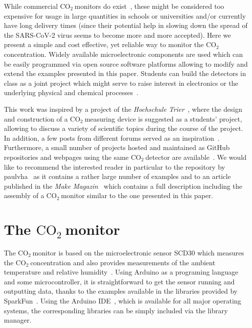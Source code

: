 \documentclass[12pt,a4paper]{article}
\newcommand{\coo}{\ensuremath{\mathrm{CO_2}~}}
\begin{document}
While commercial \coo monitors do exist~\cite{ARANET2020,TFA2020,WOEHLER2020}, these might be considered too expensive for usage in large quantities in schools or universities and/or currently have long delivery times (since their potential help in slowing down the spread of the SARS-CoV-2 virus seems to become more and more accepted). Here we present a simple and cost effective, yet reliable way to monitor the \coo concentration. Widely available microelectronic components are used which can be easily programmed via open source software platforms allowing to modify and extend the examples presented in this paper. Students can build the detectors in class as a joint project which might serve to raise interest in electronics or the underlying physical and chemical processes~\cite{WATZKA2011}. 

This work was inspired by a project of the \textit{Hochschule Trier}~\cite{BIRKENFELD2020}, where the design and construction of a \coo measuring device is suggested as a students' project, allowing to discuss a variety of scientific topics during the course of the project. In addition, a few posts from different forums served as an inspiration~\cite{BOYLES2020,METROPOL2020,OMBRA2020,ZENTRIS2020}. Furthermore, a small number of projects hosted and maintained as GitHub repositories and webpages using the same \coo detector are available~\cite{MKETZ2020,NETZBASTELN2020,PAULVHA2020,RUHE2020}. We would like to recommend the interested reader in particular to the repository by paulvha~\cite{PAULVHA2020} as it contains a rather large number of examples and to an article published in the \textit{Make Magazin}~\cite{MAKEMAGAZIN2020} which contains a full description including the assembly of a \coo monitor similar to the one presented in this paper.


\section{The \coo monitor}\label{s:co2monitor}
The \coo monitor is based on the microelectronic sensor SCD30 which measures the \coo concentration and also provides measurements of the ambient temperature and relative humidity~\cite{SENSIRION2020B}. Using Arduino as a programing language and some microcontroller, it is straightforward to get the sensor running and outputting data, thanks to the examples available in the libraries provided by SparkFun~\cite{SPARKFUN2020}. Using the Arduino IDE~\cite{ARDUINOIDE2020}, which is available for all major operating systems, the corresponding libraries can be simply included via the library manager. 
\end{document}
